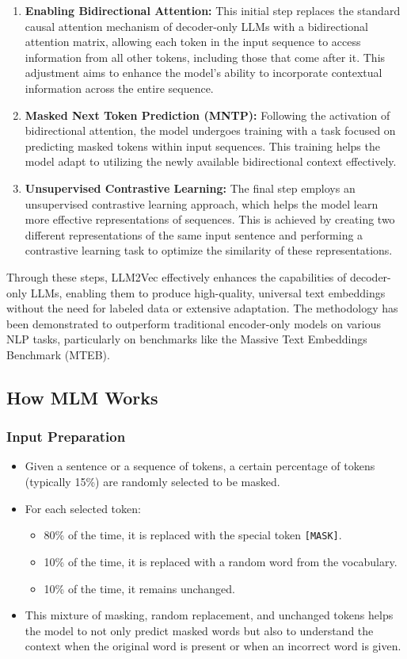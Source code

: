 \documentclass{article} %
\begin{document}
\begin{enumerate}
   \item {\bf Enabling Bidirectional Attention:} This initial step replaces the standard causal attention mechanism of decoder-only LLMs with a bidirectional attention matrix, allowing each token in the input sequence to access information from all other tokens, including those that come after it. This adjustment aims to enhance the model's ability to incorporate contextual information across the entire sequence.
   \item {\bf Masked Next Token Prediction (MNTP):} Following the activation of bidirectional attention, the model undergoes training with a task focused on predicting masked tokens within input sequences. This training helps the model adapt to utilizing the newly available bidirectional context effectively.
   \item {\bf Unsupervised Contrastive Learning:} The final step employs an unsupervised contrastive learning approach, which helps the model learn more effective representations of sequences. This is achieved by creating two different representations of the same input sentence and performing a contrastive learning task to optimize the similarity of these representations.
\end{enumerate}

Through these steps, LLM2Vec effectively enhances the capabilities of decoder-only LLMs, enabling them to produce high-quality, universal text embeddings without the need for labeled data or extensive adaptation. The methodology has been demonstrated to outperform traditional encoder-only models on various NLP tasks, particularly on benchmarks like the Massive Text Embeddings Benchmark (MTEB).

\subsection{How MLM Works}
\subsubsection{Input Preparation}
\begin{itemize}
    \item Given a sentence or a sequence of tokens, a certain percentage of tokens (typically 15\%) are randomly selected to be masked.
    \item For each selected token:
    \begin{itemize}
        \item 80\% of the time, it is replaced with the special token \texttt{[MASK]}.
        \item 10\% of the time, it is replaced with a random word from the vocabulary.
        \item 10\% of the time, it remains unchanged.
    \end{itemize}
    \item This mixture of masking, random replacement, and unchanged tokens helps the model to not only predict masked words but also to understand the context when the original word is present or when an incorrect word is given.
\end{itemize}
\end{document}
